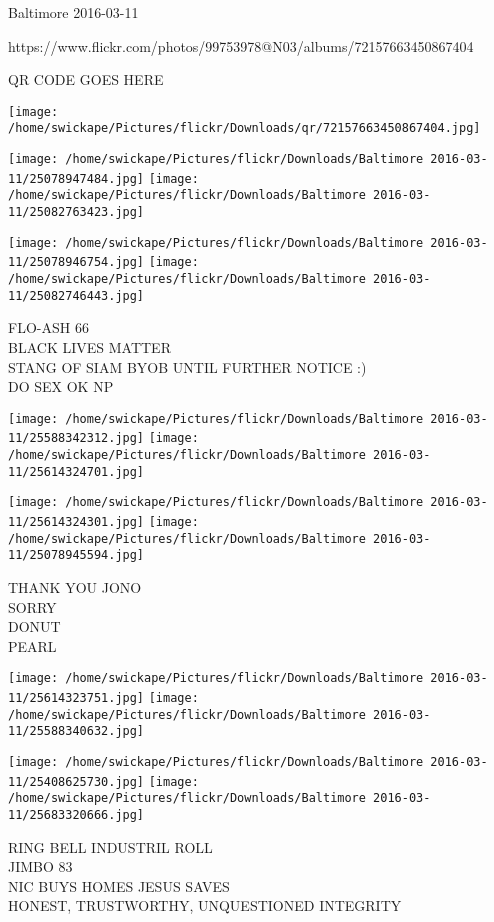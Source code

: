 \documentclass[10pt,letterpaper]{article}
\begin{document}
Baltimore 2016-03-11

https://www.flickr.com/photos/99753978@N03/albums/72157663450867404

QR CODE GOES HERE

\texttt{[image: /home/swickape/Pictures/flickr/Downloads/qr/72157663450867404.jpg]}
\pagebreak

\texttt{[image: /home/swickape/Pictures/flickr/Downloads/Baltimore 2016-03-11/25078947484.jpg]}
\texttt{[image: /home/swickape/Pictures/flickr/Downloads/Baltimore 2016-03-11/25082763423.jpg]}

\texttt{[image: /home/swickape/Pictures/flickr/Downloads/Baltimore 2016-03-11/25078946754.jpg]}
\texttt{[image: /home/swickape/Pictures/flickr/Downloads/Baltimore 2016-03-11/25082746443.jpg]}

FLO{-}ASH 66\\
BLACK LIVES MATTER\\
STANG OF SIAM BYOB UNTIL FURTHER NOTICE :)\\
DO SEX OK NP\\
\pagebreak

\texttt{[image: /home/swickape/Pictures/flickr/Downloads/Baltimore 2016-03-11/25588342312.jpg]}
\texttt{[image: /home/swickape/Pictures/flickr/Downloads/Baltimore 2016-03-11/25614324701.jpg]}

\texttt{[image: /home/swickape/Pictures/flickr/Downloads/Baltimore 2016-03-11/25614324301.jpg]}
\texttt{[image: /home/swickape/Pictures/flickr/Downloads/Baltimore 2016-03-11/25078945594.jpg]}

THANK YOU JONO\\
SORRY\\
DONUT\\
PEARL\\
\pagebreak

\texttt{[image: /home/swickape/Pictures/flickr/Downloads/Baltimore 2016-03-11/25614323751.jpg]}
\texttt{[image: /home/swickape/Pictures/flickr/Downloads/Baltimore 2016-03-11/25588340632.jpg]}

\texttt{[image: /home/swickape/Pictures/flickr/Downloads/Baltimore 2016-03-11/25408625730.jpg]}
\texttt{[image: /home/swickape/Pictures/flickr/Downloads/Baltimore 2016-03-11/25683320666.jpg]}

RING BELL INDUSTRIL ROLL\\
JIMBO 83\\
NIC BUYS HOMES JESUS SAVES\\
HONEST, TRUSTWORTHY, UNQUESTIONED INTEGRITY\\
\pagebreak
\end{document}
